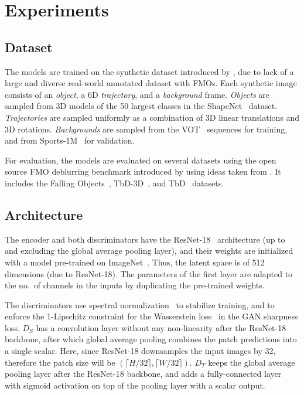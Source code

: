 \section{Experiments}

\subsection{Dataset}
    The models are trained on the synthetic dataset introduced by \citet{defmo}, due to lack of a large and diverse real-world annotated dataset with FMOs.
    Each synthetic image consists of an \textit{object}, a 6D \textit{trajectory}, and a \textit{background} frame.
    \textit{Objects} are sampled from 3D models of the 50 largest classes in the ShapeNet~\citep{shapenet} dataset.
    \textit{Trajectories} are sampled uniformly as a combination of 3D linear translations and 3D rotations.
    \textit{Backgrounds} are sampled from the VOT~\citep{vot} sequences for training, and from Sports-1M~\citep{sports-1m} for validation.

    For evaluation, the models are evaluated on several datasets using the open source FMO deblurring benchmark introduced by \citet{defmo} using ideas taken from \citet{fmo}.
    It includes the Falling Objects~\citep{falling-objs}, TbD-3D~\citep{tbd-3d}, and TbD~\citep{tbd} datasets.

\subsection{Architecture}
    The encoder and both discriminators have the ResNet-18~\citep{resnet} architecture (up to and excluding the global average pooling layer), and their weights are initialized with a model pre-trained on ImageNet~\citep{imagenet}.
    Thus, the latent space is of 512 dimensions (due to ResNet-18).
    The parameters of the first layer are adapted to the no.\ of channels in the inputs by duplicating the pre-trained weights.

    The discriminators use spectral normalization~\citep{spectral-norm} to stabilize training, and to enforce the 1-Lipschitz constraint for the Wasserstein loss~\citep{wgan} in the GAN sharpness loss.
    $D_S$ has a convolution layer without any non-linearity after the ResNet-18 backbone, after which global average pooling combines the patch predictions into a single scalar.
    Here, since ResNet-18 downsamples the input images by 32, therefore the patch size will be $(\lceil H/32 \rceil, \lceil W/32 \rceil)$.
    $D_T$ keeps the global average pooling layer after the ResNet-18 backbone, and adds a fully-connected layer with sigmoid activation on top of the pooling layer with a scalar output.

